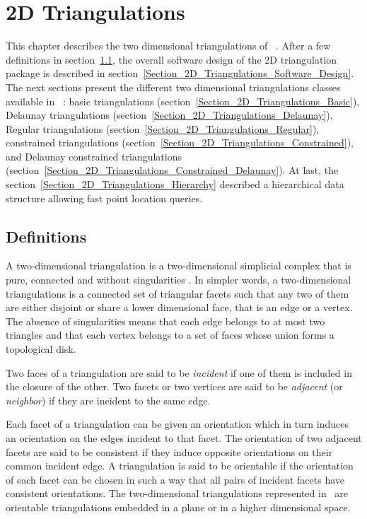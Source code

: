 \newcommand{\triangulationcomment}[1]{}

\chapter{2D Triangulations} \label{Chapter_2D_Triangulations}

This chapter describes the two dimensional triangulations
of \cgal\ . After a few definitions in 
section~\ref{Section_2D_Triangulations_Definitions}, 
the overall software
design of the 2D triangulation package is described 
in section~\ref{Section_2D_Triangulations_Software_Design}.
The next sections present the different two dimensional triangulations classes
available in  \cgal\ : 
basic triangulations (section~\ref{Section_2D_Triangulations_Basic}),
Delaunay triangulations
(section~\ref{Section_2D_Triangulations_Delaunay}),
Regular triangulations
(section~\ref{Section_2D_Triangulations_Regular}),
constrained triangulations
(section~\ref{Section_2D_Triangulations_Constrained}),
and Delaunay constrained triangulations
(section~\ref{Section_2D_Triangulations_Constrained_Delaunay}).
At last, the section~\ref{Section_2D_Triangulations_Hierarchy}
described a hierarchical data structure allowing
fast point location queries.

\section{Definitions}
\label{Section_2D_Triangulations_Definitions}
A two-dimensional triangulation is a two-dimensional simplicial
complex that is pure, connected and without singularities
\cite{by-ag-98}. 
In simpler words, a two-dimensional triangulations is a connected set
of
triangular facets such that  any two of them
are either disjoint or share a lower dimensional face, 
that is an edge or a vertex.
The absence of singularities means that each edge belongs to 
at most two triangles and that each vertex belongs  to a set  of faces
whose union forms a topological disk.

Two faces of a triangulation are said to be {\em incident} if one of
them is included in the closure of the other. Two facets or two vertices
are said to be {\em adjacent}
 (or {\em neighbor}) if they are incident to the same edge.

Each facet of a triangulation can be given an orientation
which in turn induces an orientation
on the edges incident to that facet. The orientation of two adjacent
facets are said to be consistent if they induce
opposite orientations on their common incident edge.
A triangulation is said to be orientable if 
the orientation of each facet can be chosen in such a way
that all pairs of incident facets have consistent orientations. 
The two-dimensional triangulations represented in \cgal\
are orientable triangulations
embedded in a plane or in a higher dimensional space.

